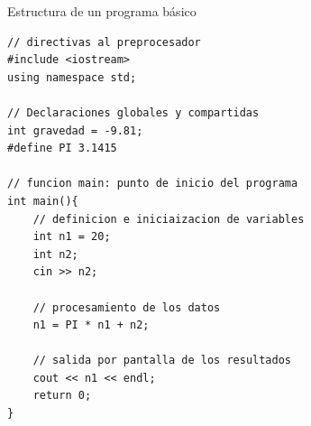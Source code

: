 \documentclass[12pt]{beamer}
\begin{document}
\begin{frame}[fragile]{Estructura de un programa básico}
\begin{lstlisting}[basicstyle=\scriptsize]
// directivas al preprocesador
#include <iostream>
using namespace std;

// Declaraciones globales y compartidas
int gravedad = -9.81;
#define PI 3.1415

// funcion main: punto de inicio del programa
int main(){
    // definicion e iniciaizacion de variables
    int n1 = 20;
    int n2;
    cin >> n2;

    // procesamiento de los datos
    n1 = PI * n1 + n2;

    // salida por pantalla de los resultados
    cout << n1 << endl;
    return 0;
}
\end{lstlisting}
\end{frame}
\end{document}
